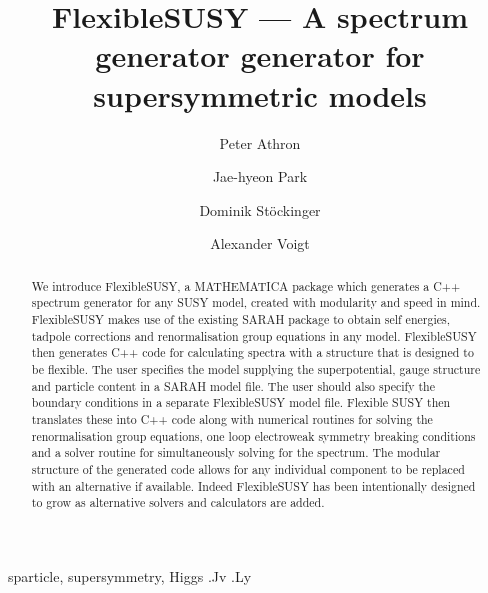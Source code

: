 \documentclass[final,3p,times,pdflatex]{elsarticle}
\newcommand{\sarah}{SARAH\xspace}
\newcommand{\fs}{FlexibleSUSY\xspace}
\begin{document}
\begin{frontmatter}

 \title{\Large\bf FlexibleSUSY --- A spectrum generator generator for supersymmetric models}

\author{Peter Athron}
\address{ARC Centre of Excellence for Particle Physics at 
the Tera-scale, School of Chemistry and Physics, University of Adelaide, 
Adelaide SA 5005 Australia}
\author{Jae-hyeon Park}
\author{Dominik St\"ockinger}
\author{Alexander Voigt}
\address{Institut f\"ur Kern- und Teilchenphysik,
TU Dresden, Zellescher Weg 19, 01069 Dresden, Germany}
   
  \begin{abstract}
   We introduce \fs, a MATHEMATICA package which generates a C++
   spectrum generator for any SUSY model, created with modularity and
   speed in mind.  \fs makes use of the existing \sarah package
   to obtain self energies, tadpole corrections and renormalisation
   group equations in any model.  \fs then generates C++ code for
   calculating spectra with a structure that is designed to be
   flexible. The user specifies the model supplying the
   superpotential, gauge structure and particle content in a \sarah
   model file. The user should also specify the boundary conditions in
   a separate \fs model file.  Flexible SUSY
   then translates these into C++ code along with numerical routines
   for solving the renormalisation group equations, one loop
   electroweak symmetry breaking conditions and a solver routine for
   simultaneously solving for the spectrum.  The modular structure of
   the generated code allows for any individual component to be
   replaced with an alternative if available.  Indeed \fs has been
   intentionally designed to grow as alternative solvers and
   calculators are added.
  \end{abstract}
\begin{keyword}
sparticle, 
supersymmetry, 
Higgs
.Jv
.Ly
\end{keyword}
\end{frontmatter}
\end{document}
